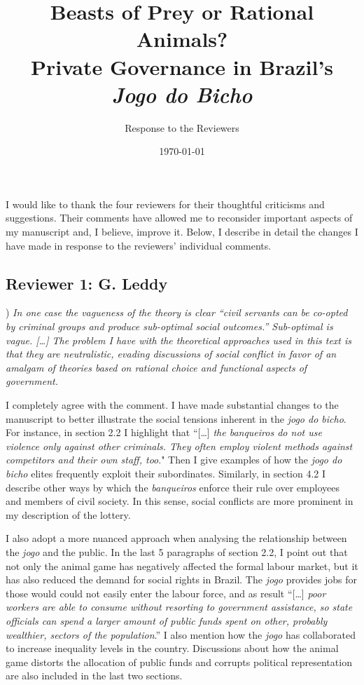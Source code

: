 \documentclass[a4paper,12pt]{article}
\title{Beasts of Prey or Rational Animals? \\Private Governance in Brazil's \textit{Jogo do Bicho}}
\author{Response to the Reviewers}
\date{\today}
\begin{document}
\maketitle

I would like to thank the four reviewers for their thoughtful criticisms and suggestions. Their comments have allowed me to reconsider important aspects of my manuscript and, I believe, improve it. Below, I describe in detail the changes I have made in response to the reviewers' individual comments.

\subsection*{Reviewer 1: G. Leddy} %
\label{sub:reviewer_1_g_leddy}

) \textit{In one case the vagueness of the theory is clear ``civil servants can be co-opted by criminal groups and produce sub-optimal social outcomes.'' Sub-optimal is vague. [\dots] The problem I have with the theoretical approaches used in this text is that they are neutralistic, evading discussions of social conflict in favor of an amalgam of theories based on rational choice and functional aspects of government.}

\vspace{.25cm}

I completely agree with the comment. I have made substantial changes to the manuscript to better illustrate the social tensions inherent in the \textit{jogo do bicho}. For instance, in section 2.2 I highlight that ``[\dots] \textit{the banqueiros do not use violence only against other criminals. They often employ violent methods against competitors and their own staff, too}." Then I give examples of how the \textit{jogo do bicho} elites frequently exploit their subordinates. Similarly, in section 4.2 I describe other ways by which the \textit{banqueiros} enforce their rule over employees and members of civil society. In this sense, social conflicts are more prominent in my description of the lottery. 

I also adopt a more nuanced approach when analysing the relationship between the \textit{jogo} and the public. In the last 5 paragraphs of section 2.2, I point out that not only the animal game has negatively affected the formal labour market, but it has also reduced the demand for social rights in Brazil. The \textit{jogo} provides jobs for those would could not easily enter the labour force, and as result ``[\dots] \textit{poor workers are able to consume without resorting to government assistance, so state officials can spend a larger amount of public funds spent on other, probably wealthier, sectors of the population}.'' I also mention how the \textit{jogo} has collaborated to increase inequality levels in the country. Discussions about how the animal game distorts the allocation of public funds and corrupts political representation are also included in the last two sections.
\end{document}
